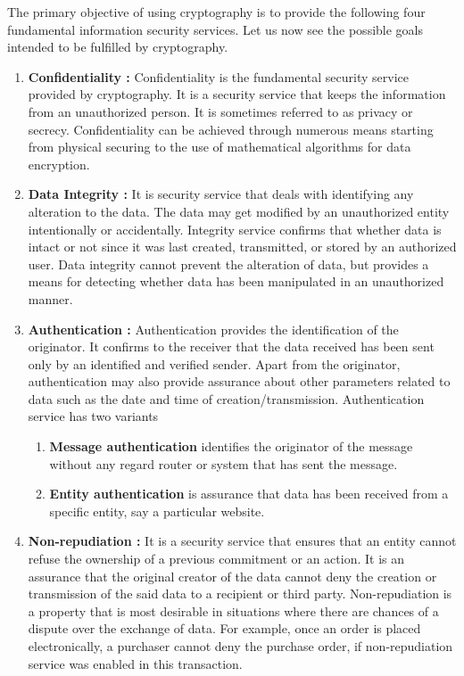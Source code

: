 \documentclass[british]{article}
\begin{document}
The primary objective of using cryptography is to provide the following
four fundamental information security services. Let us now see the
possible goals intended to be fulfilled by cryptography.
\begin{enumerate}
	\item \textbf{Confidentiality : }Confidentiality is the fundamental security
	      service provided by cryptography. It is a security service that keeps
	      the information from an unauthorized person. It is sometimes referred
	      to as privacy or secrecy. Confidentiality can be achieved through
	      numerous means starting from physical securing to the use of mathematical
	      algorithms for data encryption.
	\item \textbf{Data Integrity :} It is security service that deals with identifying
	      any alteration to the data. The data may get modified by an unauthorized
	      entity intentionally or accidentally. Integrity service confirms that
	      whether data is intact or not since it was last created, transmitted,
	      or stored by an authorized user. Data integrity cannot prevent the
	      alteration of data, but provides a means for detecting whether data
	      has been manipulated in an unauthorized manner.
	\item \textbf{Authentication : }Authentication provides the identification
	      of the originator. It confirms to the receiver that the data received
	      has been sent only by an identified and verified sender. Apart from
	      the originator, authentication may also provide assurance about other
	      parameters related to data such as the date and time of creation/transmission.
	      Authentication service has two variants \textminus{}
	      \begin{enumerate}
		      \item \textbf{Message authentication} identifies the originator of the message
		            without any regard router or system that has sent the message.
		      \item \textbf{Entity authentication} is assurance that data has been received
		            from a specific entity, say a particular website.
	      \end{enumerate}
	\item \textbf{Non-repudiation : }It is a security service that ensures that
	      an entity cannot refuse the ownership of a previous commitment or
	      an action. It is an assurance that the original creator of the data
	      cannot deny the creation or transmission of the said data to a recipient
	      or third party. Non-repudiation is a property that is most desirable
	      in situations where there are chances of a dispute over the exchange
	      of data. For example, once an order is placed electronically, a purchaser
	      cannot deny the purchase order, if non-repudiation service was enabled
	      in this transaction.
\end{enumerate}
\end{document}
